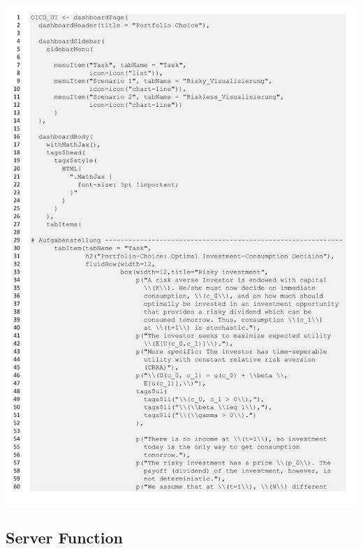 \begin{center}
    \includegraphics[scale=0.75, page = 5]{files/UI.pdf}
\end{center}



\hypertarget{Server function}{} \subsection*{Server Function}

